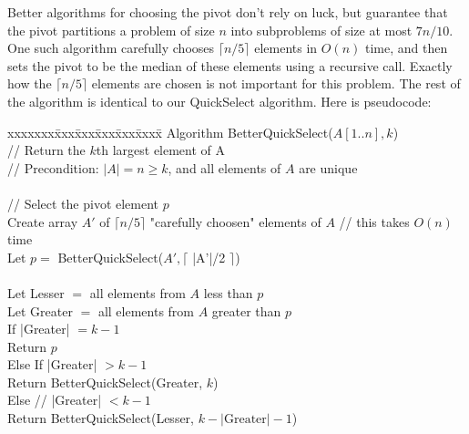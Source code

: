 \documentclass[11pt]{article}
\begin{document}
Better algorithms for choosing the pivot don't rely on luck, but
guarantee that the pivot partitions a problem of size $n$ into subproblems of
size at most $7n/10$. One such algorithm carefully chooses $\lceil n/5 \rceil$
elements in $O(n)$ time, and then sets the pivot to be the median
of these elements using a recursive call.  Exactly how the $\lceil n/5 \rceil$
elements are chosen is not important for this problem.  The rest of
the algorithm is identical to our QuickSelect algorithm. Here is
pseudocode:

\begin{tabbing}
xxxxxxx\=xxx\=xxx\=xxx\=xxx\=xxxx\= \kill
\> Algorithm  BetterQuickSelect($A[1..n], k$) \\
\>\> // Return the $k$th largest element of A  \\
\>\> // Precondition: $|A| = n \ge k$, and all elements of $A$ are unique \\ \\

\>\> // Select the pivot element $p$ \\
\>\> Create array $A'$ of $\lceil n/5 \rceil$ "carefully choosen" elements of $A$ // this takes $O(n)$ time \\
\>\> Let $p =$ BetterQuickSelect($A', \lceil$ |A'|/2 $\rceil$) \\ \\
\>\> Let Lesser  $=$ all elements from $A$ less than $p$ \\ 
\>\> Let Greater $=$ all elements from $A$ greater than $p$ \\
\>\> If |Greater| $= k - 1$ \\
\>\>\>  Return $p$ \\
\>\> Else If |Greater| $> k - 1$ \\
\>\>\>  Return BetterQuickSelect(Greater, $k$) \\
\>\> Else  // |Greater| $< k - 1$ \\
\>\>\>  Return BetterQuickSelect(Lesser, $k - |\mbox{Greater}| - 1$)
\end{tabbing}
\end{document}
